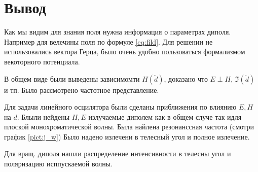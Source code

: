 \documentclass[a4paper]{article}
\numberwithin{equation}{section}
\begin{document}
\section{Вывод}

Как мы видим для знания поля нужна информация о параметрах диполя. 
Например для велечины поля по формуле \ref{eq:fild}. Для решении 
не использовались вектора Герца, было очень удобно пользоваться 
формализмом векоторного потенциала.

В общем виде были выведены зависимомти $H(\ddot d)$, доказано что $E \perp H$,
$\mathfrak{I}(\ddot d)$ и тп. Было рассмотрено частотное представление.

Для задачи линейного осцилятора были сделаны приближения по влиянию $E, H$ на 
$d$. Блыли нейдены $H, E$ излучаемые диполем как в общем случе так идля плоской 
монохроматической волны. Была найлена резонанссная частота (смотри график \ref{pict:j_w})
Было надено излечени в телесный угол и полное излечение.

Для вращ. диполя нашли распределение интенсивности в телесны угол и 
поляризацию исппускаемой волны.
\end{document}
